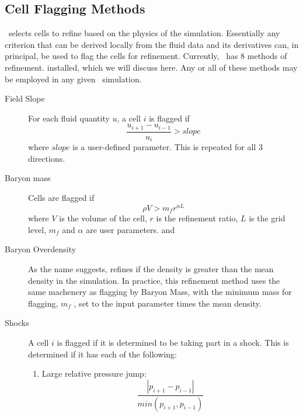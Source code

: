 \subsection{Cell Flagging Methods}\label{sec.flagging}
\enzo\ selects cells to refine based on the physics of the simulation.
Essentially any criterion that can be derived locally from the fluid
data and its derivatives can, in principal, be used to flag the cells
for refinement. Currently, \enzo\ has 8 methods of refinement.
installed, which we will discuss here.  Any or all of these methods may be employed in
any given \enzo\ simulation.  
\begin{description}
  \item[Field Slope]  For each
  fluid quantity $u$, a cell $i$ is flagged if 
$$ \frac{u_{i+1}-u_{i-1}}{u_i} > slope $$
  where $slope$  is
  a  user-defined
  parameter. This is repeated for all
  3 directions. 
  \item[Baryon mass]   Cells
  are flagged if $$ \rho  V > m_{f} r^{\alpha L} $$ 
  where $V$ is the
  volume of the cell, $r$ is the refinement ratio, $L$ is the grid
  level, $m_{f}$ and ${\alpha}$ are user parameters.  and 
  \item[Baryon Overdensity] As the name suggests, refines if the
  density is greater than the mean density in the simulation.  In
  practice, this refinement method uses the same machenery as flagging
  by Baryon Mass, with the minimum
  mass for flagging, $m_f$ , set to the
  input parameter  times the
  mean density.  
  \item[Shocks]   A cell $i$ is flagged if it is
  determined to be taking part in a shock.  This is determined if it
  has each of the following:
  \begin{enumerate}
    \item Large relative pressure jump: 
      $$\frac{|p_{i+1} - p_{i-1}| }{min( p_{i+1}, p_{i-1} ) }
$$
\end{enumerate}
\end{description}
